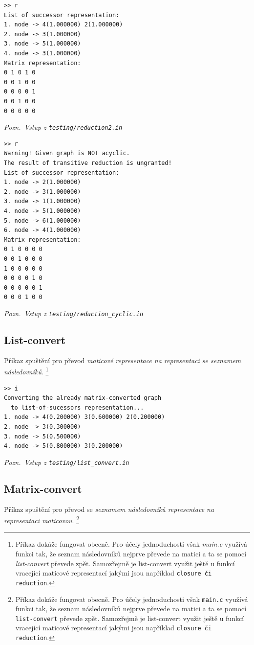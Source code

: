 \documentclass[11pt,a4paper]{article}
\begin{document}
\begin{verbatim}
>> r
List of successor representation:
1. node -> 4(1.000000) 2(1.000000)
2. node -> 3(1.000000)
3. node -> 5(1.000000)
4. node -> 3(1.000000)
Matrix representation:
0 1 0 1 0 
0 0 1 0 0 
0 0 0 0 1 
0 0 1 0 0 
0 0 0 0 0 
\end{verbatim}

{\noindent \sl Pozn.~Vstup z \tt testing/reduction2.in}

\begin{verbatim}
>> r
Warning! Given graph is NOT acyclic.
The result of transitive reduction is ungranted!
List of successor representation:
1. node -> 2(1.000000)
2. node -> 3(1.000000)
3. node -> 1(1.000000)
4. node -> 5(1.000000)
5. node -> 6(1.000000)
6. node -> 4(1.000000)
Matrix representation:
0 1 0 0 0 0 
0 0 1 0 0 0 
1 0 0 0 0 0 
0 0 0 0 1 0 
0 0 0 0 0 1 
0 0 0 1 0 0 
\end{verbatim}

{\noindent \sl Pozn.~Vstup z \tt testing/reduction\_cyclic.in}

\subsection{List-convert}
Příkaz spuštění pro převod {\sl maticové \rm representace na representaci se
  \sl seznamem následovníků\/}.%
\footnote{Příkaz dokáže fungovat obecně.
Pro účely jednoduchosti však {\sl main.c} využívá funkci tak, že seznam
  následovníků nejprve převede na matici a ta se pomocí {\sl list-convert}
  převede zpět.
Samozřejmě je list-convert využit ještě u funkcí vracející maticové
  representací jakými jsou například {\tt closure\/ {\rm či} reduction\/}.
}
\vfil\eject
\begin{verbatim}
>> i
Converting the already matrix-converted graph
  to list-of-sucessors representation...
1. node -> 4(0.200000) 3(0.600000) 2(0.200000)
2. node -> 3(0.300000)
3. node -> 5(0.500000)
4. node -> 5(0.800000) 3(0.200000)
\end{verbatim}

{\noindent \sl Pozn.~Vstup z \tt testing/list\_convert.in}

\subsection{Matrix-convert}
Příkaz spuštění pro převod se {\sl seznamem následovníků \rm representace na
  representaci \sl maticovou\/}.%
\footnote{Příkaz dokáže fungovat obecně.
Pro účely jednoduchosti však {\tt main.c} využívá funkci tak, že seznam
  následovníků nejprve převede na matici a ta se pomocí {\tt list-convert}
  převede zpět.
Samozřejmě je list-convert využit ještě u funkcí vracející maticové
  representací jakými jsou například {\tt closure či \tt reduction\/}.
}
\end{document}

